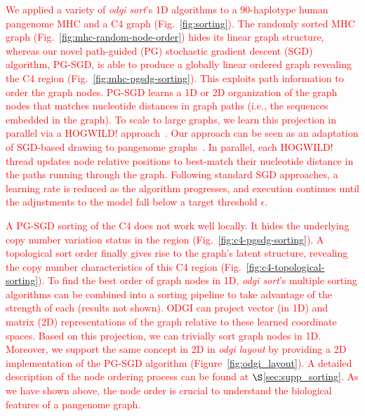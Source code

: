 \documentclass{bioinfo}
\newcommand{\REVIEWED}[1]{{\textcolor{Red}{#1}}}
\begin{document}
\REVIEWED{We applied a variety of \textit{odgi sort}'s 1D algorithms to a 90-haplotype human pangenome MHC and a C4 graph (Fig.~\ref{fig:sorting}).
The randomly sorted MHC graph (Fig.~\ref{fig:mhc-random-node-order}) hides its linear graph structure, whereas our novel path-guided (PG) stochastic gradient descent (SGD) algorithm, PG-SGD, is able to produce a globally linear ordered graph revealing the C4 region (Fig.~\ref{fig:mhc-pgsdg-sorting}).
This exploits path information to order the graph nodes.
PG-SGD learns a 1D or 2D organization of the graph nodes that matches nucleotide distances in graph paths (i.e., the sequences embedded in the graph).
To scale to large graphs, we learn this projection in parallel via a HOGWILD! approach~\citep{niu2011hogwild}.
Our approach can be seen as an adaptation of SGD-based drawing to pangenome graphs~\citep{zheng2018graph}.
In parallel, each HOGWILD! thread updates node relative positions to best-match their nucleotide distance in the paths running through the graph.
Following standard SGD approaches, a learning rate is reduced as the algorithm progresses, and execution continues until the adjustments to the model fall below a target threshold $\epsilon$.}

\REVIEWED{A PG-SGD sorting of the C4 does not work well locally. It hides the underlying copy number variation status in the region (Fig.~\ref{fig:c4-pgsdg-sorting}). A topological sort order finally gives rise to the graph's latent structure, revealing the copy number characteristics of this C4 region (Fig.~\ref{fig:c4-topological-sorting}). }
%
\REVIEWED{To find the best order of graph nodes in 1D, \textit{odgi sort}'s multiple sorting algorithms can be combined into a sorting pipeline to take advantage of the strength of each (results not shown).
ODGI can project vector (in 1D) and matrix (2D) representations of the graph relative to these learned coordinate spaces.
Based on this projection, we can trivially sort graph nodes in 1D.
Moreover, we support the same concept in 2D in \textit{odgi layout} by providing a 2D implementation of the PG-SGD algorithm (Figure~\ref{fig:odgi_layout}). A detailed description of the node ordering process can be found at $\S$\ref{sec:supp_sorting}. As we have shown above, the node order is crucial to understand the biological features of a pangenome graph.}
\end{document}
